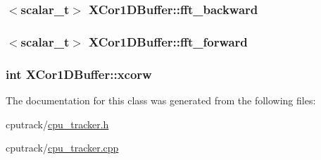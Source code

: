 \subsubsection[{\texorpdfstring{fft\+\_\+backward}{fft_backward}}]{$<${\bf scalar\+\_\+t}$>$ X\+Cor1\+D\+Buffer\+::fft\+\_\+backward}\hypertarget{class_x_cor1_d_buffer_afc27a4abe914d01397a98e174983916a}{}\label{class_x_cor1_d_buffer_afc27a4abe914d01397a98e174983916a}
\subsubsection[{\texorpdfstring{fft\+\_\+forward}{fft_forward}}]{$<${\bf scalar\+\_\+t}$>$ X\+Cor1\+D\+Buffer\+::fft\+\_\+forward}\hypertarget{class_x_cor1_d_buffer_ab7aa1608417f91f44fdc4acc963e6d3b}{}\label{class_x_cor1_d_buffer_ab7aa1608417f91f44fdc4acc963e6d3b}
\subsubsection[{\texorpdfstring{xcorw}{xcorw}}]{\setlength{\rightskip}{0pt plus 5cm}int X\+Cor1\+D\+Buffer\+::xcorw}\hypertarget{class_x_cor1_d_buffer_a3a5d68c065a62d412b4d615647b30788}{}\label{class_x_cor1_d_buffer_a3a5d68c065a62d412b4d615647b30788}


The documentation for this class was generated from the following files\+:\begin{DoxyCompactItemize}
\item 
cputrack/\hyperlink{cpu__tracker_8h}{cpu\+\_\+tracker.\+h}\item 
cputrack/\hyperlink{cpu__tracker_8cpp}{cpu\+\_\+tracker.\+cpp}\end{DoxyCompactItemize}
